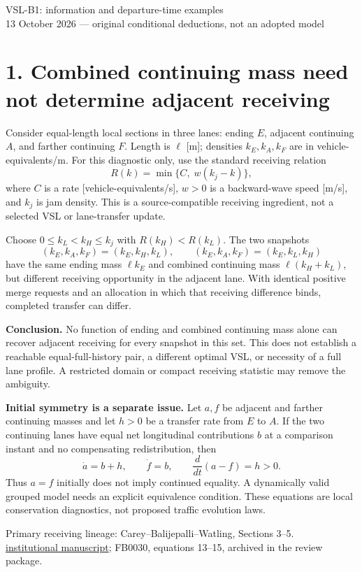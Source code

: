 \documentclass[11pt,a4paper]{article}
\begin{document}
\begin{center}
{\Large VSL-B1: information and departure-time examples}\\[4pt]
13 October 2026 --- original conditional deductions, not an adopted model
\end{center}

\section*{1. Combined continuing mass need not determine adjacent receiving}
Consider equal-length local sections in three lanes: ending $E$, adjacent
continuing $A$, and farther continuing $F$. Length is $\ell$ [m]; densities
$k_E,k_A,k_F$ are in vehicle-equivalents/m. For this diagnostic only, use the
standard receiving relation
\[
R(k)=\min\{C,\;w(k_j-k)\},
\]
where $C$ is a rate [vehicle-equivalents/s], $w>0$ is a backward-wave speed
[m/s], and $k_j$ is jam density. This is a source-compatible receiving
ingredient, not a selected VSL or lane-transfer update.

Choose $0\leq k_L<k_H\leq k_j$ with $R(k_H)<R(k_L)$. The two snapshots
\[
 (k_E,k_A,k_F)=(k_E,k_H,k_L),\qquad
 (k_E,k_A,k_F)=(k_E,k_L,k_H)
\]
have the same ending mass $\ell k_E$ and combined continuing mass
$\ell(k_H+k_L)$, but different receiving opportunity in the adjacent lane.
With identical positive merge requests and an allocation in which that
receiving difference binds, completed transfer can differ.

\textbf{Conclusion.} No function of ending and combined continuing mass alone
can recover adjacent receiving for every snapshot in this set. This does not
establish a reachable equal-full-history pair, a different optimal VSL, or
necessity of a full lane profile. A restricted domain or compact receiving
statistic may remove the ambiguity.

\textbf{Initial symmetry is a separate issue.} Let $a,f$ be adjacent and farther
continuing masses and let $h>0$ be a transfer rate from $E$ to $A$. If the two
continuing lanes have equal net longitudinal contributions $b$ at a comparison
instant and no compensating redistribution, then
\[
 \dot a=b+h,\qquad \dot f=b,\qquad
 \frac{d}{dt}(a-f)=h>0.
\]
Thus $a=f$ initially does not imply continued equality. A dynamically valid
grouped model needs an explicit equivalence condition. These equations are
local conservation diagnostics, not proposed traffic evolution laws.

\vfill
Primary receiving lineage: Carey--Balijepalli--Watling, Sections 3--5.\\
\href{https://eprints.whiterose.ac.uk/id/eprint/77315/7/Carey\%20et\%20al\%202013_with_coversheet.pdf}{institutional manuscript};
FB0030, equations 13--15, archived in the review package.
\end{document}

